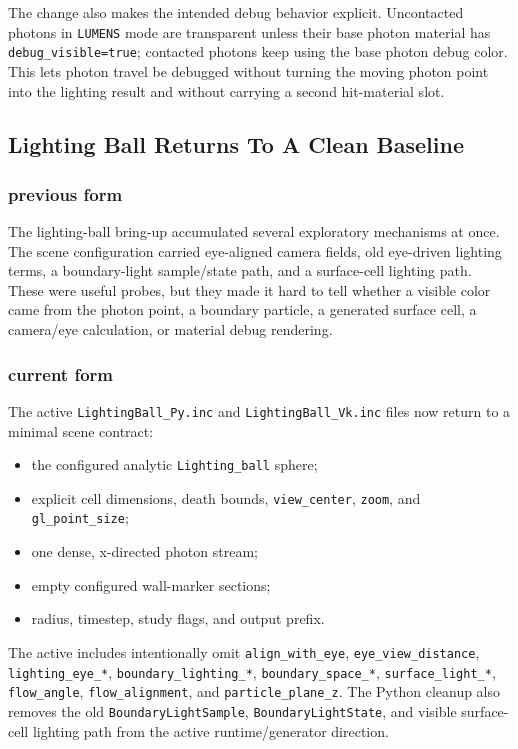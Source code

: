 The change also makes the intended debug behavior explicit.  Uncontacted
photons in \texttt{LUMENS} mode are transparent unless their base photon
material has \texttt{debug\_visible=true}; contacted photons keep using the
base photon debug color.  This lets photon travel be debugged without turning
the moving photon point into the lighting result and without carrying a
second hit-material slot.

\subsection{Lighting Ball Returns To A Clean Baseline}

\subsubsection{previous form}

The lighting-ball bring-up accumulated several exploratory mechanisms at
once.  The scene configuration carried eye-aligned camera fields, old
eye-driven lighting terms, a boundary-light sample/state path, and a
surface-cell lighting path.  These were useful probes, but they made it hard
to tell whether a visible color came from the photon point, a boundary
particle, a generated surface cell, a camera/eye calculation, or material
debug rendering.

\subsubsection{current form}

The active \texttt{LightingBall\_Py.inc} and
\texttt{LightingBall\_Vk.inc} files now return to a minimal scene contract:
\begin{itemize}
    \item the configured analytic \texttt{Lighting\_ball} sphere;
    \item explicit cell dimensions, death bounds, \texttt{view\_center},
          \texttt{zoom}, and \texttt{gl\_point\_size};
    \item one dense, x-directed photon stream;
    \item empty configured wall-marker sections;
    \item radius, timestep, study flags, and output prefix.
\end{itemize}

The active includes intentionally omit \texttt{align\_with\_eye},
\texttt{eye\_view\_distance}, \texttt{lighting\_eye\_*},
\texttt{boundary\_lighting\_*}, \texttt{boundary\_space\_*},
\texttt{surface\_light\_*}, \texttt{flow\_angle},
\texttt{flow\_alignment}, and \texttt{particle\_plane\_z}.  The Python
cleanup also removes the old \texttt{BoundaryLightSample},
\texttt{BoundaryLightState}, and visible surface-cell lighting path from the
active runtime/generator direction.

